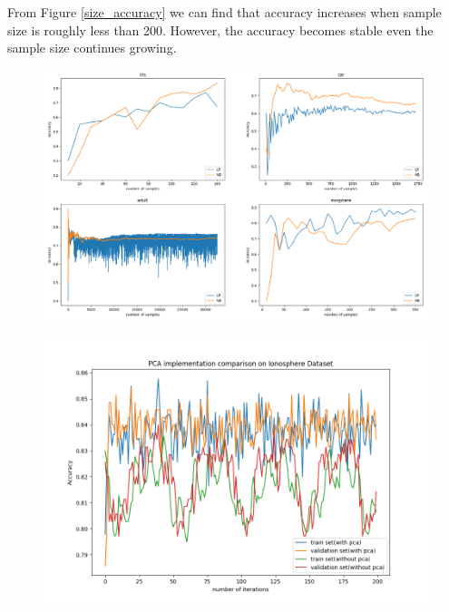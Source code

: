 \documentclass[11pt]{scrartcl}
\begin{document}
From Figure \ref{size_accuracy} we can find that accuracy increases when sample size is roughly less than 200. However, the accuracy becomes stable even the sample size continues growing. 

\begin{figure}[H]
	\centering
	\begin{minipage}{\linewidth}
		\begin{minipage}[b]{0.5\linewidth}
		  \centering
		  \includegraphics[width= \linewidth]{fig/dataset_size.png}
		  \label{size_accuracy}
		\end{minipage}
		\hfill
		\begin{minipage}[b]{0.48\linewidth}
		  \centering			
		  \includegraphics[width= \linewidth]{fig/PCA.png}
		  \label{pca}
		\end{minipage}
	\end{minipage}
\end{figure}
\end{document}
